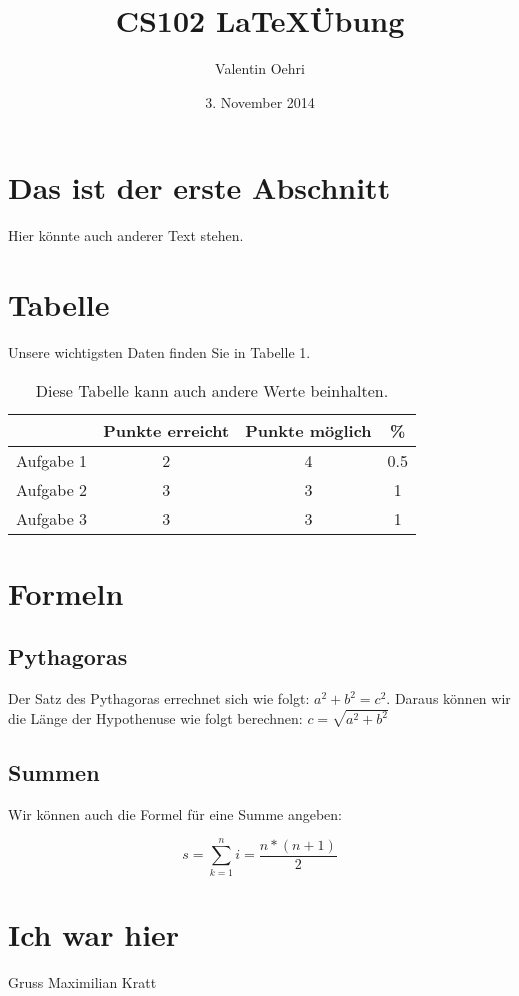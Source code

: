 \documentclass[11pt]{article}
\date{3. November 2014}
\author{Valentin Oehri}
\title{CS102 \LaTeX \"Ubung}
\begin{document}
\maketitle
\section{Das ist der erste Abschnitt}
Hier k\"onnte auch anderer Text stehen.
\section{Tabelle}
Unsere wichtigsten Daten finden Sie in Tabelle 1.
\begin{table} [htbp]
\centering
\begin{tabular}{c|c|c|c}
  & Punkte erreicht & Punkte m\"oglich & \% \\
\hline
Aufgabe 1 & 2 & 4 & 0.5 \\
Aufgabe 2 & 3 & 3 & 1 \\
Aufgabe 3 & 3 & 3 & 1 \\
\end{tabular}
\caption{Diese Tabelle kann auch andere Werte beinhalten.}
\end{table}

\section{Formeln}
\subsection{Pythagoras}
Der Satz des Pythagoras errechnet sich wie folgt: $a^2+b^2=c^2$. Daraus k\"onnen wir die L\"ange der Hypothenuse wie folgt berechnen: $c=\sqrt{a^2+b^2}$
\subsection{Summen}
Wir k\"onnen auch die Formel f\"ur eine Summe angeben:

\begin{equation}
s = \sum_{k=1}^ni=\frac{n*(n+1)}{2}
\end{equation}
\section{Ich war hier}
Gruss  
Maximilian Kratt
\end{document}
